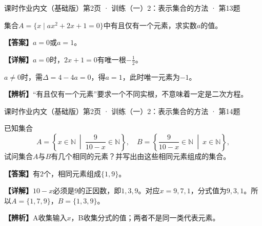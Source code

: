 \documentclass[UTF8,10pt,aspectratio=169]{ctexbeamer}
\newcommand{\Answer}[1]{\par\vspace{0.2cm}\textbf{【答案】}#1}
\newcommand{\Analysis}[1]{\par\vspace{0.2cm}\textbf{【详解】}#1}
\newcommand{\N}{\mathbb N}
\newcommand{\Tip}[1]{\par\vspace{0.2cm}\textbf{【辨析】}#1}
\newcommand{\Source}[1]{{\scriptsize\color{gray}#1}\par\vspace{0.25cm}}
\begin{document}
\begin{frame}
\Source{课时作业内文（基础版）第2页 · 训练（一）2：表示集合的方法 · 第13题}
集合$A=\{x\mid ax^2+2x+1=0\}$中有且仅有一个元素，求实数$a$的值。
\pause
\Answer{$a=0$或$a=1$。}
\Analysis{$a=0$时，$2x+1=0$有唯一根$-\frac12$。
\par $a\ne0$时，需$\Delta=4-4a=0$，得$a=1$，此时唯一元素为$-1$。}
\Tip{“有且仅有一个元素”要求一个不同实根，不意味着一定是二次方程。}
\end{frame}
\begin{frame}
\Source{课时作业内文（基础版）第2页 · 训练（一）2：表示集合的方法 · 第14题}
已知集合
\[A=\left\{x\in\N\ \middle|\ \frac9{10-x}\in\N\right\},\quad
B=\left\{\frac9{10-x}\in\N\ \middle|\ x\in\N\right\},\]
试问集合$A$与$B$有几个相同的元素？并写出由这些相同元素组成的集合。
\pause
\Answer{有$2$个，相同元素组成$\{1,9\}$。}
\Analysis{$10-x$必须是$9$的正因数，即$1,3,9$。对应$x=9,7,1$，分式值为$9,3,1$。所以$A=\{1,7,9\}$，$B=\{1,3,9\}$。}
\Tip{A收集输入$x$，B收集分式的值；两者不是同一类代表元素。}
\end{frame}
\end{document}
